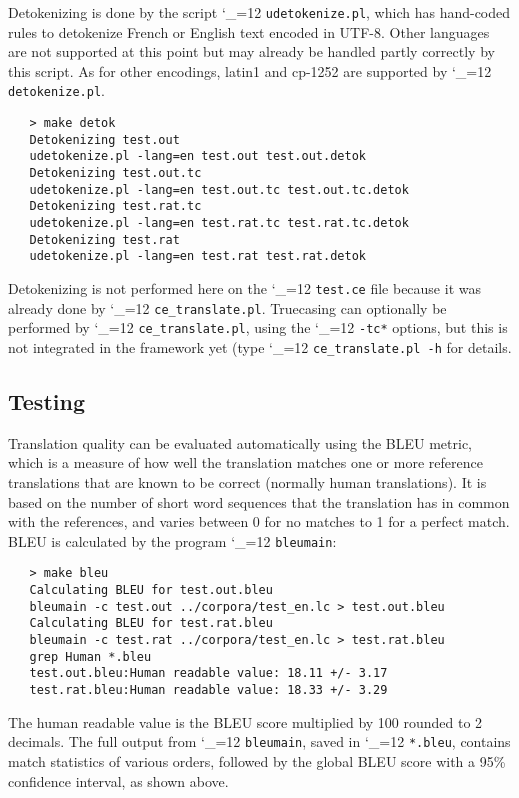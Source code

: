 \documentclass[11pt,letterpaper]{article}
\def\code{\begingroup\catcode`\_=12 \codex}
\newcommand{\codex}[1]{\texttt{#1}\endgroup}
\begin{document}
Detokenizing is done by the script \code{udetokenize.pl}, which has
hand-coded rules to detokenize French or English text encoded in UTF-8. Other
languages are not supported at this point but may already be handled partly
correctly by this script. As for other encodings, latin1 and cp-1252 are
supported by \code{detokenize.pl}.

\begin{small}
\begin{verbatim}
   > make detok
   Detokenizing test.out
   udetokenize.pl -lang=en test.out test.out.detok
   Detokenizing test.out.tc
   udetokenize.pl -lang=en test.out.tc test.out.tc.detok
   Detokenizing test.rat.tc
   udetokenize.pl -lang=en test.rat.tc test.rat.tc.detok
   Detokenizing test.rat
   udetokenize.pl -lang=en test.rat test.rat.detok
\end{verbatim}
\end{small}

Detokenizing is not performed here on the \code{test.ce} file because it was
already done by \code{ce_translate.pl}.  Truecasing can optionally be performed by
\code{ce_translate.pl}, using the \code{-tc*} options, but this is
not integrated in the framework yet (type \code{ce_translate.pl -h} for
details.

\subsection{Testing} \label{Testing}

Translation quality can be evaluated automatically using the BLEU metric, which
is a measure of how well the translation matches one or more reference
translations that are known to be correct (normally human translations). It is
based on the number of short word sequences that the translation has in common
with the references, and varies between 0 for no matches to 1 for a perfect
match. BLEU is calculated by the program \code{bleumain}:
\begin{small}
\begin{verbatim}
   > make bleu
   Calculating BLEU for test.out.bleu
   bleumain -c test.out ../corpora/test_en.lc > test.out.bleu
   Calculating BLEU for test.rat.bleu
   bleumain -c test.rat ../corpora/test_en.lc > test.rat.bleu
   grep Human *.bleu
   test.out.bleu:Human readable value: 18.11 +/- 3.17
   test.rat.bleu:Human readable value: 18.33 +/- 3.29
\end{verbatim}
\end{small}
The human readable value is the BLEU score multiplied by 100 rounded to 2
decimals. The full output from \code{bleumain}, saved in \code{*.bleu},
contains match statistics of various orders, followed by the global BLEU score
with a 95\% confidence interval, as shown above.
\end{document}
